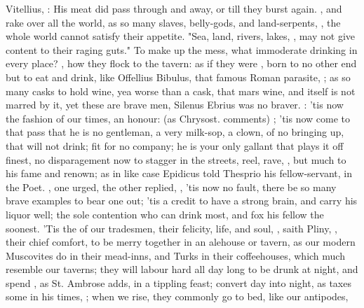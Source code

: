 Vitellius, : His meat did pass
through and away, or till they burst again. , and rake over all the world, as so many
slaves, belly-gods, and land-serpents, , the whole world cannot satisfy their appetite.
"Sea, land, rivers, lakes, \etc{}, may not give content to
their raging guts." To make up the mess, what immoderate drinking in every
place? , how they flock to the tavern: as if
they were , born to no other end but to eat and
drink, like Offellius Bibulus, that famous Roman parasite, ; as so many casks to hold wine, yea worse than a cask,
that mars wine, and itself is not marred by it, yet these are brave men,
Silenus Ebrius was no braver. : 'tis now
the fashion of our times, an honour:  (as
Chrysost.  comments) ; 'tis now come
to that pass that he is no gentleman, a very milk-sop, a clown, of no bringing
up, that will not drink; fit for no company; he is your only gallant that plays
it off finest, no disparagement now to stagger in the streets, reel, rave,
\etc{}, but much to his fame and renown; as in like case Epidicus told Thesprio
his fellow-servant, in the Poet. , one urged, the other replied, , 'tis now no fault, there be so many brave examples to bear
one out; 'tis a credit to have a strong brain, and carry his liquor well; the
sole contention who can drink most, and fox his fellow the soonest. 'Tis the
 of our tradesmen, their felicity, life, and soul, , saith Pliny, 
, their chief comfort, to
be merry together in an alehouse or tavern, as our modern Muscovites do in
their mead-inns, and Turks in their coffeehouses, which much resemble our
taverns; they will labour hard all day long to be drunk at night, and spend
, as St. Ambrose adds, in a tippling feast; convert day
into night, as \Seneca{} taxes some in his times, ; when we rise, they commonly go to bed, like our antipodes,

